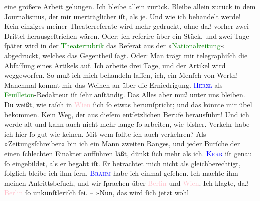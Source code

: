                eine größere Arbeit gelungen. Ich bleibe allein zurück.\pend
           \pstart
           Bleibe allein zurück in dem Journalismus, der mir unerträglicher iſt, als je. Und wie
               ich behandelt werde! Kein einziges meiner Theaterreferate wird mehr gedruckt, ohne
               daß vorher zwei Drittel herausgeſtrichen wären. {\pb} Oder: ich referire über ein Stück, und zwei Tage
               ſpäter wird in der \textcolor{green}{Theaterrubrik}{}\ledrightnote{{$\rightarrow$}\textcolor{green}{Neue Freie Presse}} das Referat aus der »\textcolor{green}{Nationalzeitung}{}\ledrightnote{\textcolor{green}{National-Zeitung}}« abgedruckt, welches das Gegentheil ſagt. Oder: Man trägt
               mir telegraphiſch die Abfaſſung eines Artikels auf. Ich arbeite drei Tage, und der
               Artikel wird weggeworfen.  So muß ich mich
               behandeln laſſen, ich, ein Menſch von Werth! Manchmal kommt mir das Weinen an über
               die Erniedrigung.\pend
           \pstart
           \textsc{\textcolor{blue}{Herzl}{}\ledrightnote{\textcolor{blue}{Theodor Herzl}}} als \textcolor{green}{Feuilleton}{}\ledrightnote{{$\rightarrow$}\textcolor{green}{Neue Freie Presse}}-Redakteur
               iſt ſehr anſtändig. Das Alles aber muß unter uns bleiben. Du weißt, wie raſch in \textcolor{pink}{Wien}{}\ledrightnote{\textcolor{pink}{Wien}} ſich ſo etwas herumſpricht; und das könnte mir
               übel bekommen.\pend
           \pstart
           Kein Weg, der aus dieſem entſetzlichen Berufe herausführt! Und ich werde alt und kann
               auch nicht mehr lange ſo arbeiten, wie bisher.\pend
           \pstart
           Verkehr habe ich hier ſo gut wie keinen. {\pb}Mit wem
               ſollte ich auch verkehren? Als »Zeitungsſchreiber« bin ich ein Mann zweiten Ranges,
               und jeder Burſche der einen ſchlechten Einakter aufführen läßt, dünkt ſich mehr als
               ich. \textsc{\textcolor{blue}{Kerr}{}\ledrightnote{\textcolor{blue}{Alfred Kerr}}} iſt genau ſo eingebildet, als er begabt iſt. Er betrachtet mich nicht als
               gleichberechtigt, folglich bleibe ich ihm fern. \textsc{\textcolor{blue}{Brahm}{}\ledrightnote{\textcolor{blue}{Otto Brahm}}} habe ich einmal geſehen. Ich machte ihm meinen Antrittsbeſuch, und  wir ſprachen über \textcolor{pink}{Berlin}{}\ledrightnote{\textcolor{pink}{Berlin}} und \textcolor{pink}{Wien}{}\ledrightnote{\textcolor{pink}{Wien}}. Ich klagte, daß \textcolor{pink}{Berlin}{}\ledrightnote{\textcolor{pink}{Berlin}} ſo unkünſtleriſch ſei. – »Nun, das wird ſich jetzt wohl
